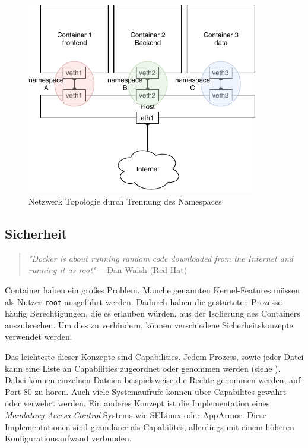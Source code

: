 \begin{figure}[h]
	\begin{center}
		\includegraphics[width=0.9\textwidth]{bilder/network-topology.pdf}
		\caption{Netzwerk Topologie durch Trennung des Namespaces}
		\label{fig:containerHostNetwork}
	\end{center}
\end{figure} 


\subsection{Sicherheit}
\label{sec:sicherheit}

\begin{quote}
	\textit{"Docker is about running random code downloaded from the Internet and running it as root"}
	\flushright
	\small{---Dan Walsh (Red Hat)}
\end{quote}

Container haben ein großes Problem. Manche genannten Kernel-Features müssen als Nutzer \texttt{root} ausgeführt werden. Dadurch haben die gestarteten Prozesse häufig Berechtigungen, die es erlauben würden, aus der Isolierung des Containers auszubrechen. Um dies zu verhindern, können verschiedene Sicherheitskonzepte verwendet werden.

Das leichteste dieser Konzepte sind Capabilities. Jedem Prozess, sowie jeder Datei kann eine Liste an Capabilities zugeordnet oder genommen werden (siehe ). Dabei können einzelnen Dateien beispielsweise die Rechte genommen werden, auf Port 80 zu hören. Auch viele Systemaufrufe können über Capabilites gewährt oder verwehrt werden. Ein anderes Konzept ist die Implementation eines \textit{Mandatory Access Control}-Systems wie SELinux oder AppArmor. Diese Implementationen sind granularer als Capabilites, allerdings mit einem höheren Konfigurationsaufwand verbunden.

